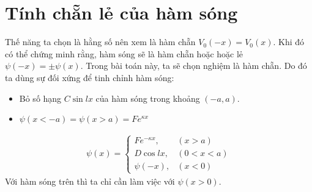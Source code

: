 \documentclass{article}
\begin{document}
	\section{Tính chẵn lẻ của hàm sóng}
	Thế năng ta chọn là hằng số nên xem là hàm chẵn $V_0(-x)=V_0(x)$. Khi đó có thể chứng minh rằng, hàm sóng sẽ là hàm chẵn hoặc hoặc lẻ $\psi (-x) = \pm \psi (x)$. Trong bài toán này, ta sẽ chọn nghiệm là hàm chẵn. Do đó ta dùng sự đối xứng để tinh chỉnh hàm sóng:
	\begin{itemize}
		\item Bỏ số hạng $C \sin{lx}$ của hàm sóng trong khoảng $(-a,a)$.
		\item $\psi(x<-a)=\psi(x>a)=Fe^{\kappa x}$
	\end{itemize} 
	\begin{align}
		\psi(x)=
		\begin{cases}
			F e^{-\kappa x}, & (x>a) \\
			D \cos{lx}, & (0<x<a) \\
			\psi(-x), & (x<0)
		\end{cases}
	\end{align}
	Với hàm sóng trên thì ta chỉ cần làm việc với $\psi(x>0)$.
\end{document}
